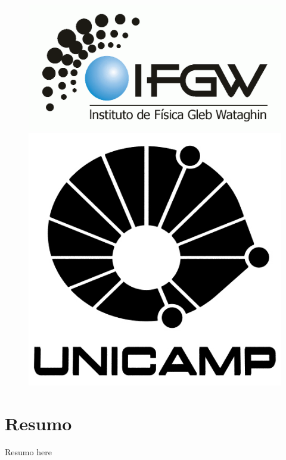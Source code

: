 \documentclass[english,brazil]{article}
\begin{document}
\begin{figure}[!ht]
	\begin{centering}
		\includegraphics[clip,scale=0.4]{logo-ifgw} 
	\par\end{centering}
	\vspace*{1cm}
	\centering{}
		\includegraphics[clip,scale=0.3]{logo-unicamp-name-line-blk-blk-0480} 
\end{figure}


\newpage{}


\section{Resumo}

	Resumo here
\end{document}
